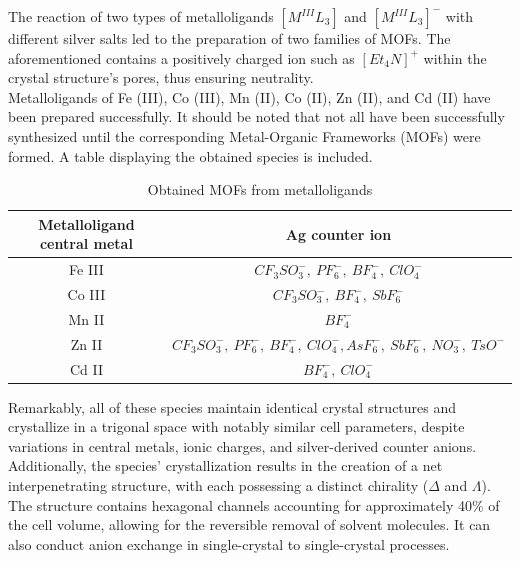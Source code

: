 \documentclass[../Master.tex]{subfiles}
\begin{document}
The reaction of two types of metalloligands \([M^{III}L_{3}]\) and \([M^{III}L_{3}]^{-}\) with different silver salts led to the preparation of two families of MOFs. The aforementioned contains a positively charged ion such as \([Et_{4}N]^{+}\) within the crystal structure's pores, thus ensuring neutrality.\\
Metalloligands of Fe (III), Co (III), Mn (II), Co (II), Zn (II), and Cd (II) have been prepared successfully.
It should be noted that not all have been successfully synthesized until the corresponding Metal-Organic Frameworks (MOFs) were formed. A table displaying the obtained species is included.\\

\begin{table}[h]
	\centering
	\begin{tabular}{cc}
		\toprule
		Metalloligand central metal & Ag counter ion                                                                                                 \\
		\midrule
		Fe III                      & \(CF_{3}SO_{3}^{-},\ PF_{6}^{-},\ BF_{4}^{-},\ ClO_{4}^{-}\)                                                   \\
		Co III                      & \(CF_{3}SO_{3}^{-},\ BF_{4}^{-},\ SbF_{6}^{-}\)                                                                \\
		Mn II                       & \(BF_{4}^{-}\)                                                                                                 \\
		Zn II                       & \(CF_{3}SO_{3}^{-},\ PF_{6}^{-},\ BF_{4}^{-},\ ClO_{4}^{-}, AsF_{6}^{-},\ SbF_{6}^{-},\ NO_{3}^{-},\ TsO^{-}\) \\
		Cd II                       & \(BF_{4}^{-},\ ClO_{4}^{-}\)                                                                                   \\
		\bottomrule
	\end{tabular}
	\caption{Obtained MOFs from metalloligands}
\end{table}

Remarkably, all of these species maintain identical crystal structures and crystallize in a trigonal space with notably similar cell parameters, despite variations in central metals, ionic charges, and silver-derived counter anions.\\
Additionally, the species' crystallization results in the creation of a net interpenetrating structure, with each possessing a distinct chirality (\(\Delta\) and \(\Lambda\)).
The structure contains hexagonal channels accounting for approximately 40\% of the cell volume, allowing for the reversible removal of solvent molecules. It can also conduct anion exchange in single-crystal to single-crystal processes.
\end{document}
